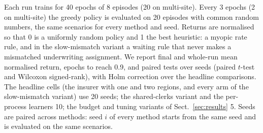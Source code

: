 Each run trains for 40 epochs of 8 episodes (20 on multi-site). Every 3 epochs (2 on
multi-site) the greedy policy is evaluated on 20 episodes with common random numbers,
the same scenarios for every method and seed. Returns are normalised so that 0 is a
uniformly random policy and 1 the best heuristic: a myopic rate rule, and in the
slow-mismatch variant a waiting rule that never makes a mismatched underwriting
assignment. We report final and whole-run mean normalised return, epochs to reach 0.9,
and paired tests over seeds (paired $t$-test and Wilcoxon signed-rank), with Holm
correction over the headline comparisons. The headline cells (the insurer with one and
two regions, and every arm of the slow-mismatch variant) use 20 seeds; the shared-clerks
variant and the per-process learners 10; the budget and tuning variants of
Sect.~\ref{sec:results} 5. Seeds are paired across methods: seed $i$ of every method
starts from the same seed and is evaluated on the same scenarios.
